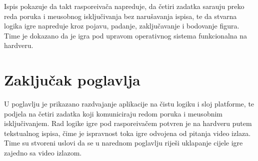 Ispis pokazuje da takt raspore\dj{}iva\v{c}a napreduje, da \v{c}etiri zadatka
sara\dj{}uju preko reda poruka i me\dj{}usobnog isklju\v{c}ivanja bez naru\v{s}avanja
ispisa, te da stvarna logika igre napreduje kroz pojavu, padanje, zaklju\v{c}avanje
i bodovanje figura. Time je dokazano da je igra pod upravom operativnog sistema
funkcionalna na hardveru.

\section{Zaklju\v{c}ak poglavlja}
\label{sec:zadaci-zakljucak}

U poglavlju je prikazano razdvajanje aplikacije na \v{c}istu logiku i sloj
platforme, te podjela na \v{c}etiri zadatka koji komuniciraju redom poruka i
me\dj{}usobnim isklju\v{c}ivanjem. Rad logike igre pod raspore\dj{}iva\v{c}em
potvr\dj{}en je na hardveru putem tekstualnog ispisa, \v{c}ime je ispravnost toka
igre odvojena od pitanja video izlaza. Time su stvoreni uslovi da se u narednom
poglavlju rije\v{s}i uklapanje cijele igre zajedno sa video izlazom.
